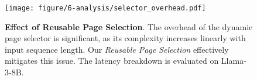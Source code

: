 \begin{figure}[t]
    \centering
    \texttt{[image: figure/6-analysis/selector\_overhead.pdf]}
    \caption{\textbf{Effect of Reusable Page Selection}. The overhead of the dynamic page selector is significant, as its complexity increases linearly with input sequence length. Our \textit{Reusable Page Selection} effectively mitigates this issue. The latency breakdown is evaluated on Llama-3-8B.} 
    \label{fig:ana:selector_overhead}
\end{figure}
